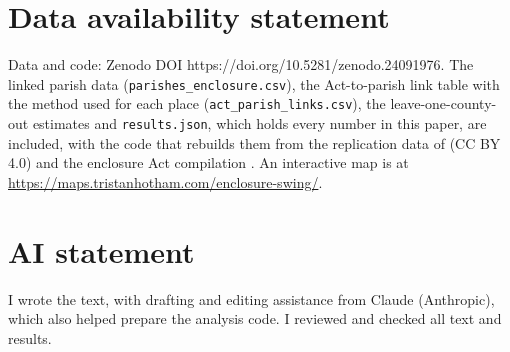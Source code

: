\documentclass[11pt,a4paper]{article}
\begin{document}
\section*{Data availability statement}
Data and code: Zenodo DOI https://doi.org/10.5281/zenodo.24091976. The linked parish data (\texttt{parishes\_enclosure.csv}), the Act-to-parish link table with the method used for each place (\texttt{act\_parish\_links.csv}), the leave-one-county-out estimates and \texttt{results.json}, which holds every number in this paper, are included, with the code that rebuilds them from the replication data of \citet{caprettinivoth2020data} (CC BY 4.0) and the enclosure Act compilation \citep{hotham2026enclosure}. An interactive map is at \url{https://maps.tristanhotham.com/enclosure-swing/}.

\section*{AI statement}
I wrote the text, with drafting and editing assistance from Claude (Anthropic), which also helped prepare the analysis code. I reviewed and checked all text and results.
\end{document}
